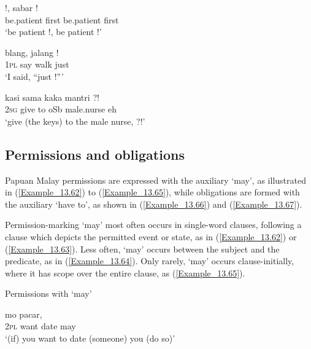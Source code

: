 \ea
\label{Example_13.59}
 {!,} {sabar} {!}\\ %
 be.patient  first  be.patient  first\\
\glt 
‘be patient !, be patient !’ \textstyleExampleSource{[080921-004b-CvNP.0051]}
\z

\ea
\label{Example_13.60}
 {blang,} {jalang} {!}\\ %
 \textsc{1pl}  say  walk  just\\
\glt 
‘I said, ``just !''' \textstyleExampleSource{[080917-008-NP.0117]}
\z

\ea
\label{Example_13.61}
 {kasi} {sama} {kaka} {mantri} {?!}\\ %
 \textsc{2sg}  give  to  oSb  male.nurse  eh\\
\glt
‘give (the keys) to the male nurse, ?!’ \textstyleExampleSource{[080922-010a-CvNF.0167]}
\z

\subsection{Permissions and obligations}
\label{Para_13.3.2}
 
Papuan Malay permissions are expressed with the auxiliary   ‘may’, as illustrated in (\ref{Example_13.62}) to (\ref{Example_13.65}), while obligations are formed with the auxiliary   ‘have to’, as shown in (\ref{Example_13.66}) and (\ref{Example_13.67}).



Permission-marking  ‘may’ most often occurs in single-word clauses, following a clause which depicts the permitted event or state, as in (\ref{Example_13.62}) or (\ref{Example_13.63}). Less often,  ‘may’ occurs between the subject and the predicate, as in (\ref{Example_13.64}). Only rarely,  ‘may’ occurs clause-initially, where it has scope over the entire clause, as (\ref{Example_13.65}).


\begin{styleExampleTitle}
Permissions with  ‘may’
\end{styleExampleTitle}

\ea
\label{Example_13.62}
 {mo} {pacar,} {}\\ %
 \textsc{2pl}  want  date  may\\
 ‘(if) you want to date (someone) you  (do so)’ \textstyleExampleSource{[081011-023-Cv.0269]}
\z

